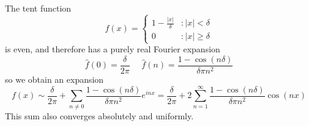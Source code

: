 \begin{example}
    The tent function
    \[ f(x) = \begin{cases} 1 - \frac{|x|}{\delta} & : |x| < \delta \\ 0 & : |x| \geq \delta \end{cases} \]
    is even, and therefore has a purely real Fourier expansion
    \[ \hat{f}(0) = \frac{\delta}{2\pi}\ \ \ \ \ \ \hat{f}(n) = \frac{1 - \cos(n\delta)}{\delta \pi n^2} \]
    so we obtain an expansion
    \[ f(x) \sim \frac{\delta}{2\pi} + \sum_{n \neq 0} \frac{1 - \cos(n\delta)}{\delta \pi n^2} e^{inx} = \frac{\delta}{2 \pi} + 2 \sum_{n = 1}^\infty \frac{1 - \cos(n\delta)}{\delta \pi n^2} \cos(nx) \]
    This sum also converges absolutely and uniformly.
\end{example}

